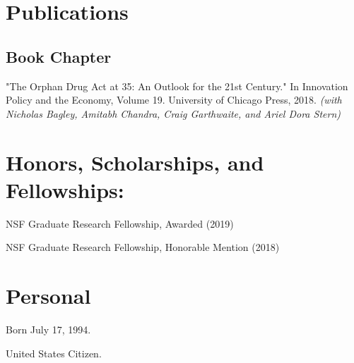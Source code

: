 \documentclass[letterpaper]{article}
\renewenvironment{itemize}{
  \begin{list}{}{
    \setlength{\leftmargin}{1.5em}
  }
}{
  \end{list}
}
\begin{document}
\section*{Publications}

\subsection*{Book Chapter}
\begin{itemize}
\item "The Orphan Drug Act at 35: An Outlook for the 21st Century." In Innovation Policy and the Economy, Volume 19. University of Chicago Press, 2018. \textit{(with Nicholas Bagley, Amitabh Chandra, Craig Garthwaite, and Ariel Dora Stern)}
\end{itemize}

\section*{Honors, Scholarships, and Fellowships:}
\begin{itemize}
\item NSF Graduate Research Fellowship, Awarded (2019)
\item NSF Graduate Research Fellowship, Honorable Mention (2018)
\end{itemize}

\section*{Personal}

\begin{itemize}
\item Born July 17, 1994.
\item United States Citizen.
\end{itemize}




%
%
%
\end{document}
